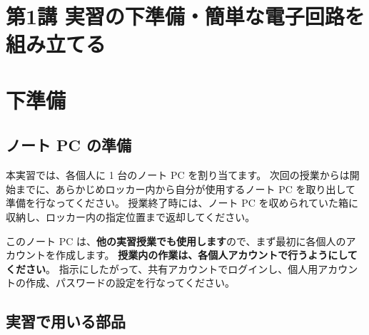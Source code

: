 \documentclass[11pt,a4paper]{jarticle}
\begin{document}
\section*{\LARGE{第1講 実習の下準備・簡単な電子回路を組み立てる}}



\section{下準備}
\subsection*{ノート PC の準備}
本実習では、各個人に 1 台のノート PC を割り当てます。
次回の授業からは開始までに、あらかじめロッカー内から自分が使用するノート PC を取り出して準備を行なってください。
授業終了時には、ノート PC を収められていた箱に収納し、ロッカー内の指定位置まで返却してください。

このノート PC は、\textbf{他の実習授業でも使用します}ので、まず最初に各個人のアカウントを作成します。
\textbf{授業内の作業は、各個人アカウントで行うようにしてください}。
指示にしたがって、共有アカウントでログインし、個人用アカウントの作成、パスワードの設定を行なってください。

\subsection*{実習で用いる部品}
\end{document}

